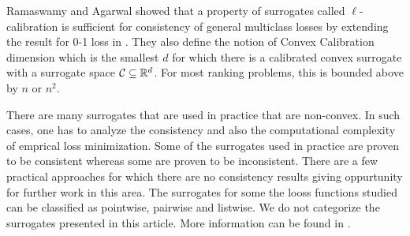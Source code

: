 Ramaswamy and Agarwal \cite{ramaswamy2016convex} showed that a property of
surrogates called $\ell$-calibration is sufficient for consistency of general
multiclass losses by extending the result for 0-1 loss in
\cite{tewari2007consistency}. They also define the notion of Convex Calibration
dimension which is the smallest $d$ for which there is a calibrated convex
surrogate with a surrogate space ${\mathcal C} \subseteq {\mathbb R}^d$. For most ranking
problems, this is bounded above by $n$ or $n^2$. 

There are many surrogates that are used in practice that are non-convex.
In such cases, one has to analyze the consistency and also the computational
complexity of emprical loss minimization. Some of the surrogates used in
practice are proven to be consistent whereas some are proven to be
inconsistent. There are a few practical approaches for which there are no
consistency results giving oppurtunity for further work in this area.
The surrogates for some the looss functions studied can be classified as
pointwise, pairwise and listwise. We do not categorize the surrogates
presented in this article. More information can be found in \cite{li2011short}.

